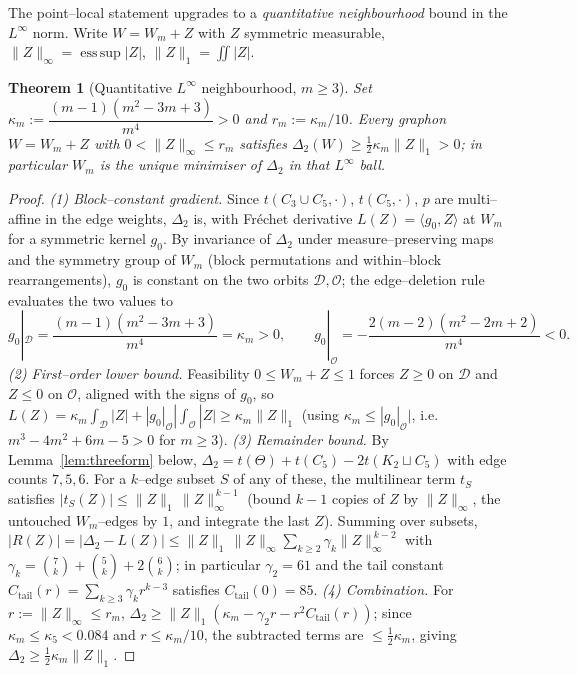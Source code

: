 \documentclass[11pt]{article}
\newtheorem{theorem}{Theorem}[section]
\theoremstyle{definition}
\newcommand{\Wm}{W_m}
\newcommand{\Ldiag}{\mathcal D}
\newcommand{\Loff}{\mathcal O}
\newcommand{\Linf}[1]{\lVert #1\rVert_\infty}
\newcommand{\Lone}[1]{\lVert #1\rVert_1}
\begin{document}
The point--local statement upgrades to a \emph{quantitative neighbourhood} bound
in the $L^\infty$ norm.  Write $W=\Wm+Z$ with $Z$ symmetric measurable,
$\Linf Z=\operatorname*{ess\,sup}|Z|$, $\Lone Z=\iint|Z|$.

\begin{theorem}[Quantitative $L^\infty$ neighbourhood, $m\ge3$]\label{thm:nbhd}
Set $\kappa_m:=\dfrac{(m-1)(m^2-3m+3)}{m^4}>0$ and $r_m:=\kappa_m/10$.  Every
graphon $W=\Wm+Z$ with $0<\Linf Z\le r_m$ satisfies
$\Delta_2(W)\ge\tfrac12\kappa_m\Lone Z>0$; in particular $\Wm$ is the unique
minimiser of $\Delta_2$ in that $L^\infty$ ball.
\end{theorem}

\begin{proof}
\emph{(1) Block--constant gradient.}  Since $t(C_3\cup C_5,\cdot)$, $t(C_5,\cdot)$,
$p$ are multi--affine in the edge weights, $\Delta_2$ is, with Fr\'echet
derivative $L(Z)=\langle g_0,Z\rangle$ at $\Wm$ for a symmetric kernel $g_0$.  By
invariance of $\Delta_2$ under measure--preserving maps and the symmetry group of
$\Wm$ (block permutations and within--block rearrangements), $g_0$ is constant on
the two orbits $\Ldiag,\Loff$; the edge--deletion rule evaluates the two values to
\[
  g_0|_{\Ldiag}=\frac{(m-1)(m^2-3m+3)}{m^4}=\kappa_m>0,\qquad
  g_0|_{\Loff}=-\frac{2(m-2)(m^2-2m+2)}{m^4}<0 .
\]
\emph{(2) First--order lower bound.}  Feasibility $0\le\Wm+Z\le1$ forces $Z\ge0$
on $\Ldiag$ and $Z\le0$ on $\Loff$, aligned with the signs of $g_0$, so
$L(Z)=\kappa_m\int_{\Ldiag}|Z|+|g_0|_{\Loff}|\int_{\Loff}|Z|\ge\kappa_m\Lone Z$
(using $\kappa_m\le|g_0|_{\Loff}|$, i.e.\ $m^3-4m^2+6m-5>0$ for $m\ge3$).
\emph{(3) Remainder bound.}  By Lemma~\ref{lem:threeform} below,
$\Delta_2=t(\Theta)+t(C_5)-2t(K_2\sqcup C_5)$ with edge counts $7,5,6$.  For a
$k$--edge subset $S$ of any of these, the multilinear term $t_S$ satisfies
$|t_S(Z)|\le\Lone Z\,\Linf Z^{\,k-1}$ (bound $k-1$ copies of $Z$ by $\Linf Z$, the
untouched $\Wm$--edges by $1$, and integrate the last $Z$).  Summing over subsets,
$|R(Z)|=|\Delta_2-L(Z)|\le\Lone Z\,\Linf Z\sum_{k\ge2}\gamma_k\Linf Z^{\,k-2}$ with
$\gamma_k=\binom7k+\binom5k+2\binom6k$; in particular $\gamma_2=61$ and the tail
constant $C_{\mathrm{tail}}(r)=\sum_{k\ge3}\gamma_k r^{k-3}$ satisfies
$C_{\mathrm{tail}}(0)=85$.  \emph{(4) Combination.}  For $r:=\Linf Z\le r_m$,
$\Delta_2\ge\Lone Z(\kappa_m-\gamma_2 r-r^2C_{\mathrm{tail}}(r))$; since
$\kappa_m\le\kappa_5<0.084$ and $r\le\kappa_m/10$, the subtracted terms are
$\le\tfrac12\kappa_m$, giving $\Delta_2\ge\tfrac12\kappa_m\Lone Z$.
\end{proof}
\end{document}
